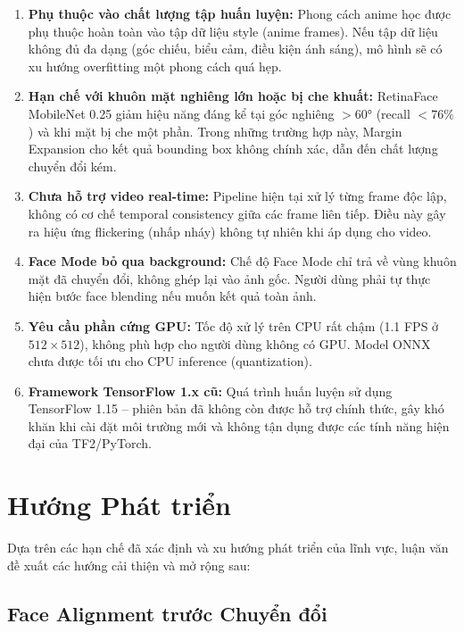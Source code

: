 \begin{enumerate}
    \item \textbf{Phụ thuộc vào chất lượng tập huấn luyện:} Phong cách anime học được phụ thuộc hoàn toàn vào tập dữ liệu style (anime frames). Nếu tập dữ liệu không đủ đa dạng (góc chiếu, biểu cảm, điều kiện ánh sáng), mô hình sẽ có xu hướng overfitting một phong cách quá hẹp.

    \item \textbf{Hạn chế với khuôn mặt nghiêng lớn hoặc bị che khuất:} RetinaFace MobileNet 0.25 giảm hiệu năng đáng kể tại góc nghiêng $>60°$ (recall $<76\%$) và khi mặt bị che một phần. Trong những trường hợp này, Margin Expansion cho kết quả bounding box không chính xác, dẫn đến chất lượng chuyển đổi kém.

    \item \textbf{Chưa hỗ trợ video real-time:} Pipeline hiện tại xử lý từng frame độc lập, không có cơ chế temporal consistency giữa các frame liên tiếp. Điều này gây ra hiệu ứng flickering (nhấp nháy) không tự nhiên khi áp dụng cho video.

    \item \textbf{Face Mode bỏ qua background:} Chế độ Face Mode chỉ trả về vùng khuôn mặt đã chuyển đổi, không ghép lại vào ảnh gốc. Người dùng phải tự thực hiện bước face blending nếu muốn kết quả toàn ảnh.

    \item \textbf{Yêu cầu phần cứng GPU:} Tốc độ xử lý trên CPU rất chậm (1.1 FPS ở $512\times512$), không phù hợp cho người dùng không có GPU. Model ONNX chưa được tối ưu cho CPU inference (quantization).

    \item \textbf{Framework TensorFlow 1.x cũ:} Quá trình huấn luyện sử dụng TensorFlow 1.15 -- phiên bản đã không còn được hỗ trợ chính thức, gây khó khăn khi cài đặt môi trường mới và không tận dụng được các tính năng hiện đại của TF2/PyTorch.
\end{enumerate}

\section{Hướng Phát triển}
\label{sec:future_work}

Dựa trên các hạn chế đã xác định và xu hướng phát triển của lĩnh vực, luận văn đề xuất các hướng cải thiện và mở rộng sau:

\subsection{Face Alignment trước Chuyển đổi}
\label{subsec:future_alignment}

